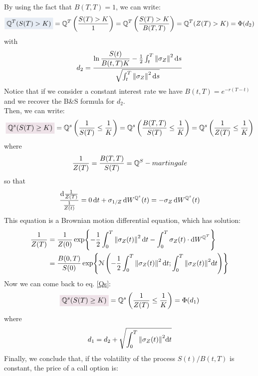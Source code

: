 By using the fact that $B(T,T)=1$, we can write:
\begin{equation*}
    \hlc{mylightblue}{\Qmeas^T(S(T)> K)} = \Qmeas^T\left(\dfrac{S(T)> K}{1}\right) = \Qmeas^T\left(\dfrac{S(T)> K}{B(T,T)}\right) = \Qmeas^T(Z(T)> K) = \Phi(d_2)
\end{equation*}
with
\begin{equation}
    d_2 = \dfrac{\ln\dfrac{S(t)}{B(t,T)K}-\frac{1}{2}\int_t^T\norm{\sigma_Z}^2\,\dd s}{\sqrt{\int_t^T\norm{\sigma_Z}^2\,\dd s}}
\end{equation}
Notice that if we consider a constant interest rate we have $B(t,T)=e^{-r(T-t)}$ and we recover the B\&S formula for $d_2$.\\ %
Then, we can write:
\begin{equation}\label{Qs}
    \hlc{mypink}{\Qmeas^s(S(T)\ge K)} = \Qmeas^s\left(\frac{1}{S(T)}\le\frac{1}{K}\right) = \Qmeas^s\left(\frac{B(T,T)}{S(T)}\le\frac{1}{K}\right) = \Qmeas^s\left(\frac{1}{Z(T)}\le\frac{1}{K}\right)
\end{equation}
where 
\begin{equation}
    \frac{1}{Z(T)} = \frac{B(T,T)}{S(T)} = \mathbb{Q}^S-martingale
\end{equation}
so that
\begin{equation}
    \dfrac{\dd \frac{1}{Z(T)}}{\frac{1}{Z(t)}} = 0\,\dd t + \sigma_{1/Z}\,\dd W^{\Qmeas^s}(t) = -\sigma_Z \,\dd W^{\Qmeas^s}(t) %
\end{equation}
This equation is a Brownian motion differential equation, which has solution:
\begin{align}
    \frac{1}{Z(T)} &= \frac{1}{Z(0)}\exp{{-\frac{1}{2}\int_0^T\norm{\sigma_Z(t)}^2\,\dd t - \int_0^T\sigma_Z(t)\cdot\dd W^{\mathbb{Q}^T}}} \\
    &= 
    \dfrac{B(0,T)}{S(0)}\exp{{\mathcal{N}\left(-\frac{1}{2}\int_0^T\norm{\sigma_Z(t)}^2\,\dd t; \int_0^T\norm{\sigma_Z(t)}^2\dd t\right)}}
\end{align}
Now we can come back to eq. \eqref{Qs}:
\begin{equation}
    \hlc{mypink}{\Qmeas^s(S(T)\ge K)} = \Qmeas^s\left(\frac{1}{Z(T)}\le\frac{1}{K}\right) = \Phi(d_1)
\end{equation}
where
\begin{equation}
    d_1 = d_2 + \sqrt{\int_0^T\norm{\sigma_Z(t)}^2\dd t}
\end{equation}
Finally, we conclude that, if the volatility of the process $S(t)/B(t,T)$ is constant, the price of a call option is:

